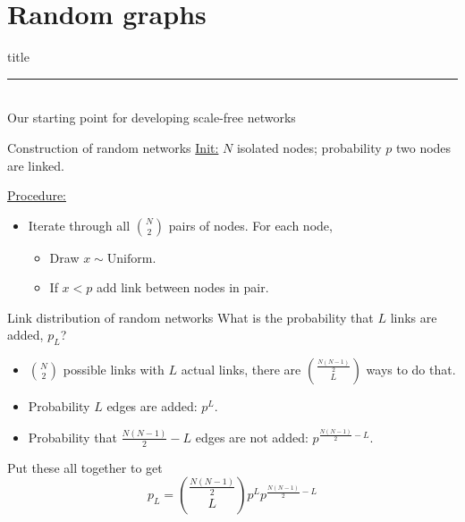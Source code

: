 \documentclass{beamer}
\begin{document}



\section{Random graphs}
\begin{frame}[plain]
  \vfill
  \centering
  \begin{beamercolorbox}[sep=8pt,center,shadow=true,rounded=true]{title}
    \insertsectionhead\par%
    \color{oxfordblue}\noindent\rule{10cm}{1pt} \\[1em]

    \centering
    Our starting point for developing scale-free networks

  \end{beamercolorbox}
\end{frame}

\begin{frame}{Construction of random networks}
  \underline{Init:} $N$ isolated nodes; probability $p$ two nodes are linked.

  \underline{Procedure:} 
  \begin{itemize}
    \item Iterate through all ${N \choose 2}$ pairs of nodes. For each node,
      \begin{itemize}
        \item Draw $x \sim \text{Uniform}$. 
        \item If $x < p$ add link between nodes in pair. 
      \end{itemize}
  \end{itemize}
\end{frame}

\begin{frame}{Link distribution of random networks}
  What is the probability that $L$ links are added, $p_L$? \\[1em]
  \begin{itemize}
    \item ${N \choose 2}$ possible links with $L$ actual links, there are
      ${\frac{N(N-1)}{2} \choose L}$ ways to do that.
    \item Probability $L$ edges are added: $p^L$.
    \item Probability that $\frac{N(N-1)}{2} - L$ edges are not added:
      $p^{\frac{N(N-1)}{2} - L}$.
  \end{itemize}
  Put these all together to get
  \[ p_L = {\frac{N(N-1)}{2} \choose L} p^L p^{\frac{N(N-1)}{2} - L} \]
\end{frame}
\end{document}
